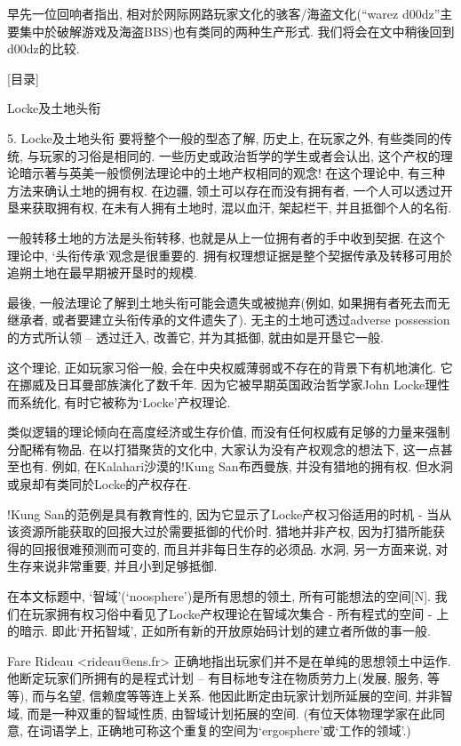 \documentclass[a4paper,12pt,UTF8,twoside]{ctexbook}
\begin{document}
早先一位回响者指出, 相对於网际网路玩家文化的骇客/海盗文化(``warez d00dz''主要集中於破解游戏及海盗BBS)也有类同的两种生产形式. 我们将会在文中稍後回到d00dz的比较.


[目录]

Locke及土地头衔

5. Locke及土地头衔
要将整个一般的型态了解, 历史上, 在玩家之外, 有些类同的传统, 与玩家的习俗是相同的. 一些历史或政治哲学的学生或者会认出, 这个产权的理论暗示著与英美一般惯例法理论中的土地产权相同的观念!
在这个理论中, 有三种方法来确认土地的拥有权.
在边疆, 领土可以存在而没有拥有者, 一个人可以透过开垦来获取拥有权, 在未有人拥有土地时, 混以血汗, 架起栏干, 并且抵御个人的名衔.

一般转移土地的方法是头衔转移, 也就是从上一位拥有者的手中收到契据. 在这个理论中, `头衔传承'观念是很重要的. 拥有权理想证据是整个契据传承及转移可用於追朔土地在最早期被开垦时的规模.

最後, 一般法理论了解到土地头衔可能会遗失或被抛弃(例如, 如果拥有者死去而无继承者, 或者要建立头衔传承的文件遗失了). 无主的土地可透过adverse possession的方式所认领 -- 透过迁入, 改善它, 并为其抵御, 就由如是开垦它一般.

这个理论, 正如玩家习俗一般, 会在中央权威薄弱或不存在的背景下有机地演化. 它在挪威及日耳曼部族演化了数千年. 因为它被早期英国政治哲学家John Locke理性而系统化, 有时它被称为`Locke'产权理论.

类似逻辑的理论倾向在高度经济或生存价值, 而没有任何权威有足够的力量来强制分配稀有物品. 在以打猎聚货的文化中, 大家认为没有产权观念的想法下, 这一点甚至也有. 例如, 在Kalahari沙漠的!Kung San布西曼族, 并没有猎地的拥有权. 但水洞或泉却有类同於Locke的产权存在.

!Kung San的范例是具有教育性的, 因为它显示了Locke产权习俗适用的时机 - 当从该资源所能获取的回报大过於需要抵御的代价时. 猎地并非产权, 因为打猎所能获得的回报很难预测而可变的, 而且并非每日生存的必须品. 水洞, 另一方面来说, 对生存来说非常重要, 并且小到足够抵御.

在本文标题中, `智域'(`noosphere')是所有思想的领土, 所有可能想法的空间[N]. 我们在玩家拥有权习俗中看见了Locke产权理论在智域次集合 - 所有程式的空间 - 上的暗示. 即此`开拓智域', 正如所有新的开放原始码计划的建立者所做的事一般.

Fare Rideau <rideau@ens.fr> 正确地指出玩家们并不是在单纯的思想领土中运作. 他断定玩家们所拥有的是程式计划 -- 有目标地专注在物质劳力上(发展, 服务, 等等), 而与名望, 信赖度等等连上关系. 他因此断定由玩家计划所延展的空间, 并非智域, 而是一种双重的智域性质, 由智域计划拓展的空间. (有位天体物理学家在此同意, 在词语学上, 正确地可称这个重复的空间为`ergosphere'或`工作的领域'.)
\end{document}
